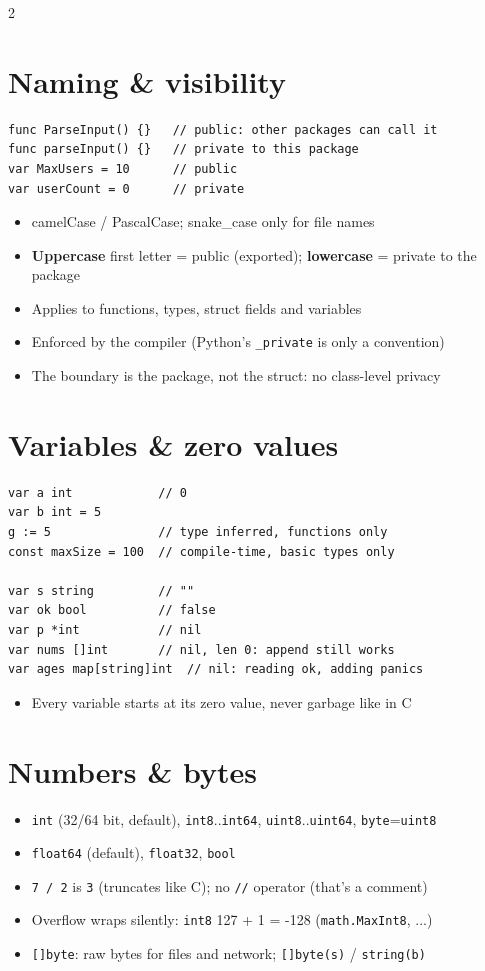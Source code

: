 \documentclass[9pt]{extarticle}
\newcommand{\kw}[1]{\textcolor{accent}{\texttt{#1}}}
\begin{document}
\begin{multicols*}{2}
\section{Naming \& visibility}
\begin{lstlisting}
func ParseInput() {}   // public: other packages can call it
func parseInput() {}   // private to this package
var MaxUsers = 10      // public
var userCount = 0      // private
\end{lstlisting}
\begin{itemize}
  \item camelCase / PascalCase; snake\_case only for file names
  \item \textbf{Uppercase} first letter = public (exported); \textbf{lowercase} = private to the package
  \item Applies to functions, types, struct fields and variables
  \item Enforced by the compiler (Python's \kw{\_private} is only a convention)
  \item The boundary is the package, not the struct: no class-level privacy
\end{itemize}

\section{Variables \& zero values}
\begin{lstlisting}
var a int            // 0
var b int = 5
g := 5               // type inferred, functions only
const maxSize = 100  // compile-time, basic types only

var s string         // ""
var ok bool          // false
var p *int           // nil
var nums []int       // nil, len 0: append still works
var ages map[string]int  // nil: reading ok, adding panics
\end{lstlisting}
\begin{itemize}
  \item Every variable starts at its zero value, never garbage like in C
\end{itemize}

\section{Numbers \& bytes}
\begin{itemize}
  \item \kw{int} (32/64 bit, default), \kw{int8}..\kw{int64}, \kw{uint8}..\kw{uint64}, \kw{byte}=\kw{uint8}
  \item \kw{float64} (default), \kw{float32}, \kw{bool}
  \item \kw{7 / 2} is \kw{3} (truncates like C); no \kw{//} operator (that's a comment)
  \item Overflow wraps silently: \kw{int8} 127 + 1 = -128 (\kw{math.MaxInt8}, ...)
  \item \kw{[]byte}: raw bytes for files and network; \kw{[]byte(s)} / \kw{string(b)}
\end{itemize}


\end{multicols*}
\end{document}
